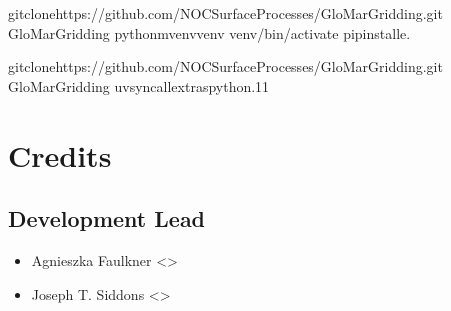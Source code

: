 \documentclass[letterpaper,10pt,english]{sphinxmanual}
\begin{document}
\begin{sphinxVerbatim}[commandchars=\\\{\}]
gitclonehttps://github.com/NOCSurfaceProcesses/GloMarGridding.git
GloMarGridding
python\PYGZhy{}mvenvvenv
venv/bin/activate
pipinstall\PYGZhy{}e.
\end{sphinxVerbatim}

\begin{sphinxVerbatim}[commandchars=\\\{\}]
gitclonehttps://github.com/NOCSurfaceProcesses/GloMarGridding.git
GloMarGridding
uvsync\PYGZhy{}\PYGZhy{}all\PYGZhy{}extras\PYGZhy{}\PYGZhy{}python.11
\end{sphinxVerbatim}

\sphinxstepscope


\chapter{Credits}
\label{\detokenize{authors:credits}}\label{\detokenize{authors::doc}}

\section{Development Lead}
\label{\detokenize{authors:development-lead}}\begin{itemize}
\item {}
\sphinxAtStartPar
Agnieszka Faulkner \textless{}\textgreater{} 

\item {}
\sphinxAtStartPar
Joseph T. Siddons \textless{}\textgreater{} 

\end{itemize}
\end{document}

